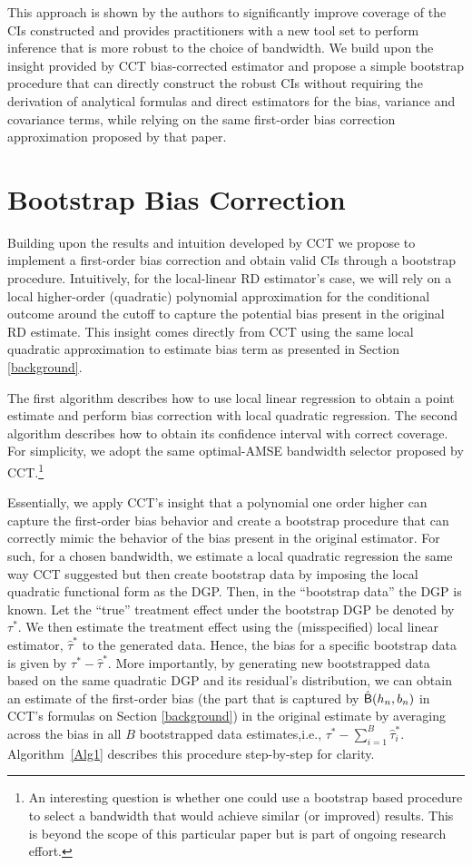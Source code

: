 \documentclass[12pt,fleqn]{article}
\begin{document}
This approach is shown by the authors to significantly improve coverage of the CIs constructed and provides practitioners with a new tool set to perform inference that is more robust to the choice of bandwidth. We build upon the insight provided by CCT bias-corrected estimator and propose a simple bootstrap procedure that can directly construct the robust CIs without requiring the derivation of analytical formulas and direct estimators for the bias, variance and covariance terms, while relying on the same first-order bias correction approximation proposed by that paper.

\section{Bootstrap Bias Correction}\label{boot}

Building upon the results and intuition developed by CCT we propose to implement a first-order bias correction and obtain valid CIs through a bootstrap procedure.
Intuitively, for the local-linear RD estimator's case, we will rely on a local higher-order (quadratic) polynomial approximation for the conditional outcome around the cutoff to capture the potential bias present in the original RD estimate. This insight comes directly from CCT using the same local quadratic approximation to estimate bias term as presented in Section \ref{background}.

The first algorithm describes how to use local linear regression to obtain a point estimate and perform bias correction with local quadratic regression. The second algorithm describes how to obtain its confidence interval with correct coverage. For simplicity, we adopt the same optimal-AMSE bandwidth selector proposed by CCT.\footnote{An interesting question is whether one could use a bootstrap based procedure to select a bandwidth that would achieve similar (or improved) results. This is beyond the scope of this particular paper but is part of ongoing research effort.} 

Essentially, we apply CCT's insight that a polynomial one order higher can capture the first-order bias behavior and create a bootstrap procedure that can correctly mimic the behavior of the bias present in the original estimator. For such, for a chosen bandwidth, we estimate a local quadratic regression the same way CCT suggested but then create bootstrap data by imposing the local quadratic functional form as the DGP. Then, in the ``bootstrap data'' the DGP is known. Let the ``true'' treatment effect under the bootstrap DGP be denoted by $\tau^{*}$. We then estimate the treatment effect using the (misspecified) local linear estimator, $\hat{\tau}^{*}$ to the generated data. Hence, the bias for a specific bootstrap data is given by $\tau^{*}-\hat{\tau}^{*}$. More importantly, by generating new bootstrapped data based on the same quadratic DGP and its residual's distribution, we can obtain an estimate of the first-order bias (the part that is captured by $\hat{\operatorname{\mathsf{B}}}(h_{n},b_{n})$ in CCT's formulas on Section \ref{background}) in the original estimate by averaging across the bias in all $B$ bootstrapped data estimates,i.e., $\tau^{*} - \sum_{i = 1}^{B} \hat{\tau}_{ i}^{*}$. Algorithm~\ref{Alg1} describes this procedure step-by-step for clarity.
\end{document}
